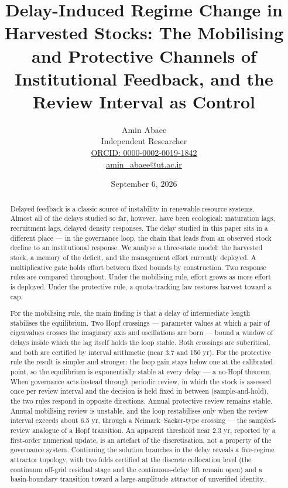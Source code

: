 \documentclass[11pt]{article}
\begin{document}
\title{Delay-Induced Regime Change in Harvested Stocks: The Mobilising and Protective Channels of Institutional Feedback, and the Review Interval as Control}
\author{Amin Abaee\\[0.35em]
{\small Independent Researcher}\\[0.55em]
{\small\href{https://orcid.org/0000-0002-0019-1842}{ORCID: 0000-0002-0019-1842}}\\[0.3em]
{\small\href{mailto:amin\_abaee@ut.ac.ir}{amin\_abaee@ut.ac.ir}}}
\date{September 6, 2026}
\maketitle

\begin{abstract}


Delayed feedback is a classic source of instability in
renewable-resource systems. Almost all of the delays studied so far,
however, have been ecological: maturation lags, recruitment lags,
delayed density responses. The delay studied in this paper sits in a
different place --- in the governance loop, the chain that leads from an
observed stock decline to an institutional response. We analyse a
three-state model: the harvested stock, a memory of the deficit, and the
management effort currently deployed. A multiplicative gate holds effort
between fixed bounds by construction. Two response rules are compared
throughout. Under the mobilising rule, effort grows as more effort is
deployed. Under the protective rule, a quota-tracking law restores
harvest toward a cap.

For the mobilising rule, the main finding is that a delay of
intermediate length stabilises the equilibrium. Two Hopf crossings ---
parameter values at which a pair of eigenvalues crosses the imaginary
axis and oscillations are born --- bound a window of delays inside which
the lag itself holds the loop stable. Both crossings are subcritical,
and both are certified by interval arithmetic (near 3.7 and 150 yr). For
the protective rule the result is simpler and stronger: the loop gain
stays below one at the calibrated point, so the equilibrium is
exponentially stable at every delay --- a no-Hopf theorem. When
governance acts instead through periodic review, in which the stock is
assessed once per review interval and the decision is held fixed in
between (sample-and-hold), the two rules respond in opposite directions.
Annual protective review remains stable. Annual mobilising review is
unstable, and the loop restabilises only when the review interval
exceeds about 6.5 yr, through a Neimark--Sacker-type crossing --- the
sampled-review analogue of a Hopf transition. An apparent threshold near
2.3 yr, reported by a first-order numerical update, is an artefact of
the discretisation, not a property of the governance system. Continuing
the solution branches in the delay reveals a five-regime attractor
topology, with two folds certified at the discrete collocation level
(the continuum off-grid residual stage and the continuous-delay lift
remain open) and a basin-boundary transition toward a large-amplitude
attractor of unverified identity.


\end{abstract}
\end{document}
